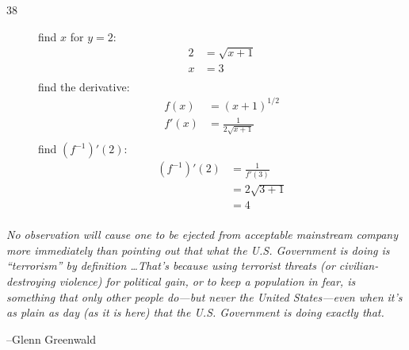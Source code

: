 \documentclass{exam}
\begin{document}
\begin{description}
\item[38]
find $x$ for $y = 2$:
\begin{align*}
  2 &= \sqrt{x + 1} \\
  x &= 3 \\
\end{align*}
find the derivative:
\begin{align*}
  f(x) &= (x + 1)^{1/2} \\
  f'(x) &= \frac{1}{2 \sqrt{x + 1}} \\
\end{align*}
find $(f^{-1})'(2)$:
\begin{align*}
  (f^{-1})'(2) &= \frac{1}{f'(3)} \\
    &= 2 \sqrt{3 + 1} \\
    &= 4 \\
\end{align*}



\end{description}

\else

\vspace{8 cm} {\em No observation will cause one to be ejected from acceptable mainstream company more immediately than
  pointing out that what the U.S. Government is doing is ``terrorism'' by definition \ldots That's because using
  terrorist threats (or civilian-destroying violence) for political gain, or to keep a population in fear, is something
  that only other people do---but never the United States---even when it's as plain as day (as it is here) that the
  U.S. Government is doing exactly that.}

\hspace{0.5 cm} --Glenn Greenwald


\fi
\end{document}
